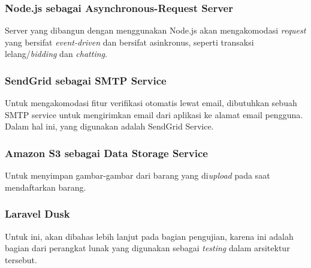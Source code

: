 	\subsubsection{\textbf{Node.js} sebagai Asynchronous-Request Server}
    Server yang dibangun dengan menggunakan Node.js akan mengakomodasi \textit{request} yang bersifat \textit{event-driven} dan bersifat asinkronus, seperti transaksi lelang/\textit{bidding} dan \textit{chatting}.
    
    \subsubsection{\textbf{SendGrid} sebagai SMTP Service}
    Untuk mengakomodasi fitur verifikasi otomatis lewat email, dibutuhkan sebuah SMTP service untuk mengirimkan email dari aplikasi ke alamat email pengguna. Dalam hal ini, yang digunakan adalah SendGrid Service.
    
    \subsubsection{\textbf{Amazon S3} sebagai Data Storage Service}
    Untuk menyimpan gambar-gambar dari barang yang di\textit{upload} pada saat mendaftarkan barang.

	\subsubsection{\textbf{Laravel Dusk}}
	Untuk ini, akan dibahas lebih lanjut pada bagian pengujian, karena ini adalah bagian dari perangkat lunak yang digunakan sebagai \textit{testing} dalam arsitektur tersebut.
      
   
      
    
